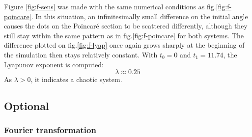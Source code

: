 \documentclass[a4paper,12pt,twoside]{article}
\begin{document}
Figure \ref{fig:f-sens} was made with the same numerical conditions as fig.\ref{fig:f-poincare}. In this situation, an infinitesimally small difference on the initial angle causes the dots on the Poincaré section to be scattered differently, although they still stay within the same pattern as in fig.\ref{fig:f-poincare} for both systems. The difference plotted on fig.\ref{fig:f-lyap} once again grows sharply at the beginning of the simulation then stays relatively constant. With $t_0=0$ and $t_1=11.74$, the Lyapunov exponent is computed:
\begin{equation*}
	\lambda \approx 0.25
\end{equation*}
As $\lambda > 0$, it indicates a chaotic system.

\subsection{Optional} %

\subsubsection{Fourier transformation}
\end{document}
